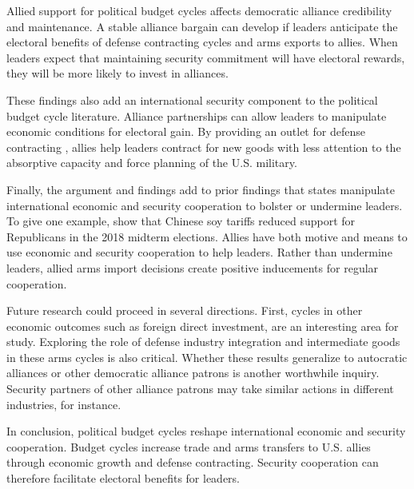 \documentclass[12pt]{article}
\begin{document}
Allied support for political budget cycles affects democratic alliance credibility and maintenance. 
A stable alliance bargain can develop if leaders anticipate the electoral benefits of defense contracting cycles and arms exports to allies.
When leaders expect that maintaining security commitment will have electoral rewards, they will be more likely to invest in alliances. 


These findings also add an international security component to the political budget cycle literature.
Alliance partnerships can allow leaders to manipulate economic conditions for electoral gain. 
By providing an outlet for defense contracting , allies help leaders contract for new goods with less attention to the absorptive capacity and force planning of the U.S. military.


Finally, the argument and findings add to prior findings that states manipulate international economic and security cooperation to bolster or undermine leaders. 
To give one example, \citet{ChyzhUrbatsch2021} show that Chinese soy tariffs reduced support for Republicans in the 2018 midterm elections. 
Allies have both motive and means to use economic and security cooperation to help leaders. 
Rather than undermine leaders, allied arms import decisions create positive inducements for regular cooperation.


Future research could proceed in several directions. 
First, cycles in other economic outcomes such as foreign direct investment, are an interesting area for study. 
Exploring the role of defense industry integration and intermediate goods in these arms cycles is also critical.
Whether these results generalize to autocratic alliances or other democratic alliance patrons is another worthwhile inquiry. 
Security partners of other alliance patrons may take similar actions in different industries, for instance.


In conclusion, political budget cycles reshape international economic and security cooperation.
Budget cycles increase trade and arms transfers to U.S. allies through economic growth and defense contracting.
Security cooperation can therefore facilitate electoral benefits for leaders. 


\newpage
\singlespace
 
 
\end{document}
